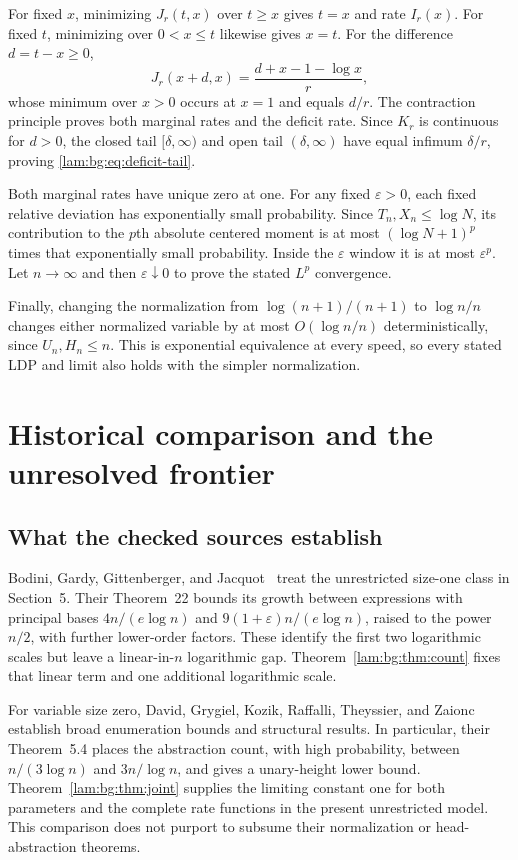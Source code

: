 \documentclass[11pt,a4paper]{article}
\numberwithin{equation}{section}
\theoremstyle{remark}
\begin{document}
For fixed $x$, minimizing $J_r(t,x)$ over $t\ge x$ gives $t=x$ and rate $I_r(x)$. For fixed $t$, minimizing over $0<x\le t$ likewise gives $x=t$. For the difference $d=t-x\ge0$,
\[
 J_r(x+d,x)=\frac{d+x-1-\log x}{r},
\]
whose minimum over $x>0$ occurs at $x=1$ and equals $d/r$. The contraction principle proves both marginal rates and the deficit rate. Since $K_r$ is continuous for $d>0$, the closed tail $[\delta,\infty)$ and open tail $(\delta,\infty)$ have equal infimum $\delta/r$, proving \eqref{lam:bg:eq:deficit-tail}.

Both marginal rates have unique zero at one. For any fixed $\varepsilon>0$, each fixed relative deviation has exponentially small probability. Since $T_n,X_n\le\log N$, its contribution to the $p$th absolute centered moment is at most $(\log N+1)^p$ times that exponentially small probability. Inside the $\varepsilon$ window it is at most $\varepsilon^p$. Let $n\to\infty$ and then $\varepsilon\downarrow0$ to prove the stated $L^p$ convergence.

Finally, changing the normalization from $\log(n+1)/(n+1)$ to $\log n/n$ changes either normalized variable by at most $O(\log n/n)$ deterministically, since $U_n,H_n\le n$. This is exponential equivalence at every speed, so every stated LDP and limit also holds with the simpler normalization.

\section{Historical comparison and the unresolved frontier}\label{lam:bg:sec:history}

\subsection{What the checked sources establish}
Bodini, Gardy, Gittenberger, and Jacquot~\cite{bggj2013} treat the unrestricted size-one class in Section~5. Their Theorem~22 bounds its growth between expressions with principal bases $4n/(e\log n)$ and $9(1+\varepsilon)n/(e\log n)$, raised to the power $n/2$, with further lower-order factors. These identify the first two logarithmic scales but leave a linear-in-$n$ logarithmic gap. Theorem~\ref{lam:bg:thm:count} fixes that linear term and one additional logarithmic scale.

For variable size zero, David, Grygiel, Kozik, Raffalli, Theyssier, and Zaionc~\cite{david2013} establish broad enumeration bounds and structural results. In particular, their Theorem~5.4 places the abstraction count, with high probability, between $n/(3\log n)$ and $3n/\log n$, and gives a unary-height lower bound. Theorem~\ref{lam:bg:thm:joint} supplies the limiting constant one for both parameters and the complete rate functions in the present unrestricted model. This comparison does not purport to subsume their normalization or head-abstraction theorems.
\end{document}
